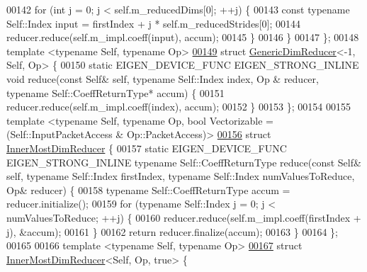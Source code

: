 \begin{DoxyCode}
00142     \textcolor{keywordflow}{for} (\textcolor{keywordtype}{int} j = 0; j < \textcolor{keyword}{self}.m\_reducedDims[0]; ++j) \{
00143       \textcolor{keyword}{const} \textcolor{keyword}{typename} Self::Index input = firstIndex + j * \textcolor{keyword}{self}.m\_reducedStrides[0];
00144       reducer.reduce(\textcolor{keyword}{self}.m\_impl.coeff(input), accum);
00145     \}
00146   \}
00147 \};
00148 \textcolor{keyword}{template} <\textcolor{keyword}{typename} Self, \textcolor{keyword}{typename} Op>
\hyperlink{struct_eigen_1_1internal_1_1_generic_dim_reducer_3-1_00_01_self_00_01_op_01_4}{00149} \textcolor{keyword}{struct }\hyperlink{struct_eigen_1_1internal_1_1_generic_dim_reducer}{GenericDimReducer}<-1, Self, Op> \{
00150   \textcolor{keyword}{static} EIGEN\_DEVICE\_FUNC EIGEN\_STRONG\_INLINE \textcolor{keywordtype}{void} reduce(\textcolor{keyword}{const} Self& \textcolor{keyword}{self}, \textcolor{keyword}{typename} Self::Index index, Op
      & reducer, \textcolor{keyword}{typename} Self::CoeffReturnType* accum) \{
00151     reducer.reduce(\textcolor{keyword}{self}.m\_impl.coeff(index), accum);
00152   \}
00153 \};
00154 
00155 \textcolor{keyword}{template} <\textcolor{keyword}{typename} Self, \textcolor{keyword}{typename} Op, \textcolor{keywordtype}{bool} Vectorizable = (Self::InputPacketAccess & Op::PacketAccess)>
\hyperlink{struct_eigen_1_1internal_1_1_inner_most_dim_reducer}{00156} \textcolor{keyword}{struct }\hyperlink{struct_eigen_1_1internal_1_1_inner_most_dim_reducer}{InnerMostDimReducer} \{
00157   \textcolor{keyword}{static} EIGEN\_DEVICE\_FUNC EIGEN\_STRONG\_INLINE \textcolor{keyword}{typename} Self::CoeffReturnType reduce(\textcolor{keyword}{const} Self& \textcolor{keyword}{self}, \textcolor{keyword}{
      typename} Self::Index firstIndex, \textcolor{keyword}{typename} Self::Index numValuesToReduce, Op& reducer) \{
00158     \textcolor{keyword}{typename} Self::CoeffReturnType accum = reducer.initialize();
00159     \textcolor{keywordflow}{for} (\textcolor{keyword}{typename} Self::Index j = 0; j < numValuesToReduce; ++j) \{
00160       reducer.reduce(\textcolor{keyword}{self}.m\_impl.coeff(firstIndex + j), &accum);
00161     \}
00162     \textcolor{keywordflow}{return} reducer.finalize(accum);
00163   \}
00164 \};
00165 
00166 \textcolor{keyword}{template} <\textcolor{keyword}{typename} Self, \textcolor{keyword}{typename} Op>
\hyperlink{struct_eigen_1_1internal_1_1_inner_most_dim_reducer_3_01_self_00_01_op_00_01true_01_4}{00167} \textcolor{keyword}{struct }\hyperlink{struct_eigen_1_1internal_1_1_inner_most_dim_reducer}{InnerMostDimReducer}<Self, Op, true> \{

\end{DoxyCode}

